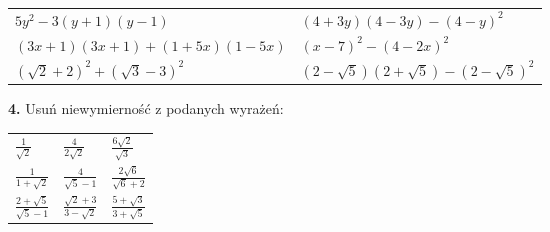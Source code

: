 \documentclass[12pt,a4paper]{article}
\theoremstyle{break}
\begin{document}
	\begin{enumerate}[a)] \begin{tabular}{p{8cm} p{8cm}} 
		\item $5y^2-3(y+1)(y-1)$ & \vspace{0.25cm}\item$(4+3y)(4-3y)-(4-y)^2$ \\
		\item $(3x+1)(3x+1)+(1+5x)(1-5x)$ & \item $(x-7)^2-(4-2x)^2$ \\
		\item $(\sqrt{2}+2)^2+(\sqrt{3}-3)^2$ & \item $(2-\sqrt{5})(2+\sqrt{5})-(2-\sqrt{5})^2$ \\
	\end{tabular} \end{enumerate}
	\newpage
				\begin{mdframed}[%
		linecolor=white,%
		innertopmargin=\topskip,
		shadowsize=0,%
		innertopmargin=5,%
		innerbottommargin=5,%
		leftmargin=10,%
		rightmargin=10,%
		backgroundcolor=gray!20,%
		innertopmargin=0pt,]
		\vspace{0.2cm}
		\textbf{4.} Usuń niewymierność z podanych wyrażeń:
	\end{mdframed}
	
	\begin{enumerate}[a)] \begin{tabular}{p{5cm} p{5cm} p{5cm}} 
			\item \Large$\frac{1}{\sqrt{2}}$ & \vspace{0.25cm}\item\Large$\frac{4}{2\sqrt{2}}$ &\vspace{0.25cm}\item \Large$\frac{6\sqrt{2}}{\sqrt{3}}$\\
			\item \Large$\frac{1}{1+\sqrt{2}}$ & \item \Large$\frac{4}{\sqrt{5}-1}$ &\item \Large$\frac{2\sqrt{6}}{\sqrt{6}+2}$\\
			\item \Large$\frac{2+\sqrt{5}}{\sqrt{5}-1}$ & \item \Large$\frac{\sqrt{2}+3}{3-\sqrt{2}}$ &\item \Large$\frac{5+\sqrt{3}}{3+\sqrt{5}}$\\
	\end{tabular} \end{enumerate}
	
\end{document}
